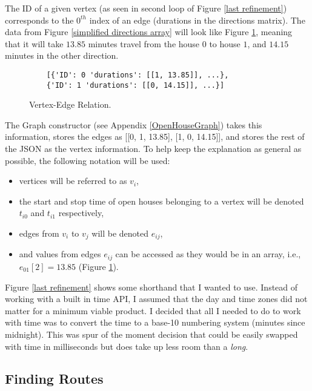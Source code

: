 \documentclass[letterpaper,11pt]{report}
\theoremstyle{definition}
\theoremstyle{definition}
\def\ie{{i.e.,}\ }
\begin{document}
The \textsf{ID} of a given vertex (as seen in second loop of Figure \ref{last refinement}) corresponds to the $0^{th}$ index of an \textsf{edge} (\textsf{durations} in the directions matrix). The data from Figure \ref{simplified directions array} will look like Figure \ref{vertex edge relation}, meaning that it will take $13.85$ minutes travel from the house $0$ to house $1$, and $14.15$ minutes in the other direction.
\begin{figure}[!htb]
  \begin{lstlisting}
    [{'ID': 0 'durations': [[1, 13.85]], ...}, 
    {'ID': 1 'durations': [[0, 14.15]], ...}]
  \end{lstlisting}
  \caption{Vertex-Edge Relation.}\label{vertex edge relation}
\end{figure}

The \textsf{Graph} constructor (see Appendix \ref{OpenHouseGraph}) takes this information, stores the edges as [[0, 1, 13.85], [1, 0, 14.15]], and stores the rest of the JSON as the vertex information. To help keep the explanation as general as possible, the following notation will be used:
\begin{itemize}
  \item vertices will be referred to as $v_i$,
  \item the start and stop time of open houses belonging to a vertex will be denoted $t_{i0}$ and $t_{i1}$ respectively,
  \item edges from $v_i$ to $v_j$ will be denoted $e_{ij}$,
  \item and values from edges $e_{ij}$ can be accessed as they would be in an array, \ie $e_{01}[2] = 13.85$ (Figure \ref{vertex edge relation}).
\end{itemize}

Figure \ref{last refinement} shows some shorthand that I wanted to use. Instead of working with a built in time API, I assumed that the day and time zones did not matter for a minimum viable product. I decided that all I needed to do to work with time was to convert the time to a base-10 numbering system (minutes since midnight). This was spur of the moment decision that could be easily swapped with time in milliseconds but does take up less room than a \emph{long}.
 
\subsection{Finding Routes}
\end{document}
